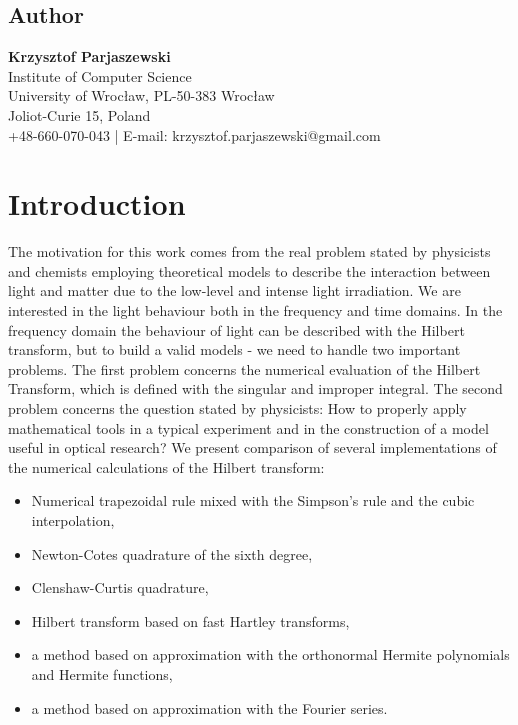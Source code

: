 \documentclass[12pt,twoside,a4paper]{article}
\numberwithin{equation}{subsection}
\numberwithin{figure}{subsection}
\begin{document}
\subsection*{Author}  \label{chap:abstract_author}

\textbf{Krzysztof Parjaszewski} \\
Institute of Computer Science \\
University of Wrocław, PL-50-383 Wrocław \\
Joliot-Curie 15, Poland \\
+48-660-070-043 | E-mail: krzysztof.parjaszewski@gmail.com

\section{Introduction} \label{chap:introduction}

The motivation for this work comes from the real problem stated by physicists and chemists employing theoretical models to
describe the interaction between light and matter due to the low-level and intense light irradiation. We are interested in the light
behaviour both in the frequency and time domains. In the frequency domain the behaviour of light can be described with the Hilbert
transform, but to build a valid models - we need to handle two important problems. The first problem concerns the numerical evaluation
of the Hilbert Transform, which is defined with the singular and improper integral. The second problem concerns the question stated by
physicists: How to properly apply mathematical tools in a typical experiment and in the construction of a model useful in optical
research? We present comparison of several implementations of the numerical calculations of the Hilbert transform:

\begin{itemize} \label{used_methods}
 \item Numerical trapezoidal rule mixed with the Simpson's rule and the
cubic interpolation,
 \item Newton-Cotes quadrature of the sixth degree,
 \item Clenshaw-Curtis quadrature,
 \item Hilbert transform based on fast Hartley transforms,
 \item a method based on approximation with the orthonormal Hermite polynomials and Hermite functions,
 \item a method based on approximation with the Fourier series.
\end{itemize}
\end{document}
